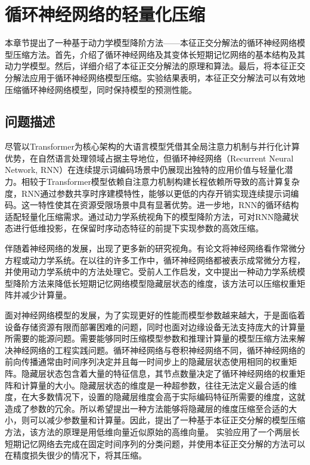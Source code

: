 \chapter{循环神经网络的轻量化压缩}
\label{cha:第三章}
本章节提出了一种基于动力学模型降阶方法——本征正交分解法的循环神经网络模型压缩方法。首先，介绍了循环神经网络及其变体长短期记忆网络的基本结构及其动力学模型。然后，详细介绍了本征正交分解法的原理和算法。最后，将本征正交分解法应用于循环神经网络模型压缩。实验结果表明，本征正交分解法可以有效地压缩循环神经网络模型，同时保持模型的预测性能。
\section{问题描述}
尽管以Transformer为核心架构的大语言模型凭借其全局注意力机制与并行化计算优势，在自然语言处理领域占据主导地位，但循环神经网络（Recurrent Neural Network, RNN）在连续提示词编码场景中仍展现出独特的应用价值与轻量化潜力\cite{liu2024gpt,liu2022p}。相较于Transformer模型依赖自注意力机制构建长程依赖所导致的高计算复杂度，RNN通过参数共享时序建模特性，能够以更低的内存开销实现连续提示词编码。这一特性使其在资源受限场景中具有显著优势。进一步地，RNN的循环结构适配轻量化压缩需求。通过动力学系统视角下的模型降阶方法，可对RNN隐藏状态进行低维投影，在保留时序动态特征的前提下实现参数的高效压缩。

伴随着神经网络的发展，出现了更多新的研究视角。有论文将神经网络看作常微分方程或动力学系统\cite{chen2018neural}。在以往的许多工作中，循环神经网络都被表示成常微分方程\cite{rubanova2019latent,mozer2017discrete}，并使用动力学系统中的方法处理它。受前人工作启发，文中提出一种动力学系统模型降阶方法来降低长短期记忆网络模型隐藏层状态的维度，该方法可以压缩权重矩阵并减少计算量。

面对神经网络模型的发展，为了实现更好的性能而模型参数越来越大，于是面临着设备存储资源有限而部署困难的问题\cite{deng2020model}，同时也面对边缘设备无法支持庞大的计算量所需要的能源问题\cite{han2015deep}。需要能够同时压缩模型参数和推理计算量的模型压缩方法来解决神经网络的工程实践问题。循环神经网络与卷积神经网络不同，循环神经网络的前向传播通常由时间序列决定并且每一时间步上的隐藏层状态使用相同的权重矩阵。隐藏层状态包含着大量的特征信息，其节点数量决定了循环神经网络的权重矩阵和计算量的大小。隐藏层状态的维度是一种超参数，往往无法定义最合适的维度，在大多数情况下，设置的隐藏层维度会高于实际编码特征所需要的维度，这就造成了参数的冗余。所以希望提出一种方法能够将隐藏层的维度压缩至合适的大小，则可以减少参数量和计算量。因此，提出了一种基于本征正交分解的模型压缩方法，该方法的原理是用低维向量近似原始的高维向量。
实验应用了一个两层长短期记忆网络去完成在固定时间序列的分类问题，并使用本征正交分解的方法可以在精度损失很少的情况下，将其压缩。

